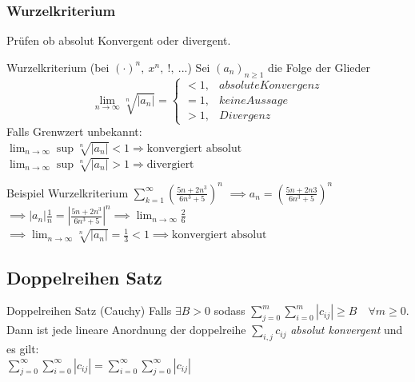 \documentclass[a4paper]{article}
\def\limn{\lim_{n\to \infty}}
\begin{document}
\subsubsection{Wurzelkriterium}
Prüfen ob absolut Konvergent oder divergent. \\
\begin{mainbox}{Wurzelkriterium (bei $(\cdot)^n, \ x^n, \ !, \ ...$)}
  Sei $(a_n)_{n \geqslant 1}$ die Folge der Glieder  
  \begin{equation*}
    \limn \sqrt[n]{\left| a_n \right|} =
    \begin{cases}
      < 1, & absolute Konvergenz \\
      = 1, & keine Aussage       \\
      > 1, & Divergenz
    \end{cases}
  \end{equation*}
  \tiny \color{gray}
  Falls Grenwzert unbekannt: \\
  $\limn \sup  \sqrt[n]{\left| a_n \right|}  < 1 \Rightarrow \text{konvergiert absolut}$ \qquad
  $\limn \sup  \sqrt[n]{\left| a_n \right|}  > 1 \Rightarrow \text{divergiert}$ \\
\normalsize \color{black}
\end{mainbox}

\begin{bspbox}{Beispiel Wurzelkriterium}
  $\sum_{k=1}^{\infty} \left(\frac{5n + 2n^3}{6n^3 + 5}\right)^n$ 
  $\implies a_n = \left(\frac{5n + 2n3}{6n^3+5}\right)^n$\\
  $\implies |a_n|\frac{1}{n}= \left|\frac{5n + 2n^3}{6n^3 + 5}\right|^n \implies \limn \frac{2}{6}$\\
  $\implies \limn \sqrt[n]{\left| a_n \right|} = \frac{1}{3} < 1 \implies \text{konvergiert absolut}$ \\
\end{bspbox}

\subsection{Doppelreihen Satz}
\begin{subbox}{Doppelreihen Satz (Cauchy)}
  Falls $\exists B > 0$ sodass $\sum_{j= 0}^{m}\sum_{i = 0}^{m} |c_{ij}| \geqslant B \quad \forall m \geqslant 0$.
  Dann ist jede lineare Anordnung der doppelreihe $\sum_{i,j}^{} c_{ij}$ \textit{absolut konvergent} und es gilt: \\
  $\sum_{j= 0}^{\infty} \sum_{i = 0}^{\infty} |c_{ij}| =  \sum_{i = 0}^{\infty} \sum_{j= 0}^{\infty} |c_{ij}|$
\end{subbox}
\end{document}
